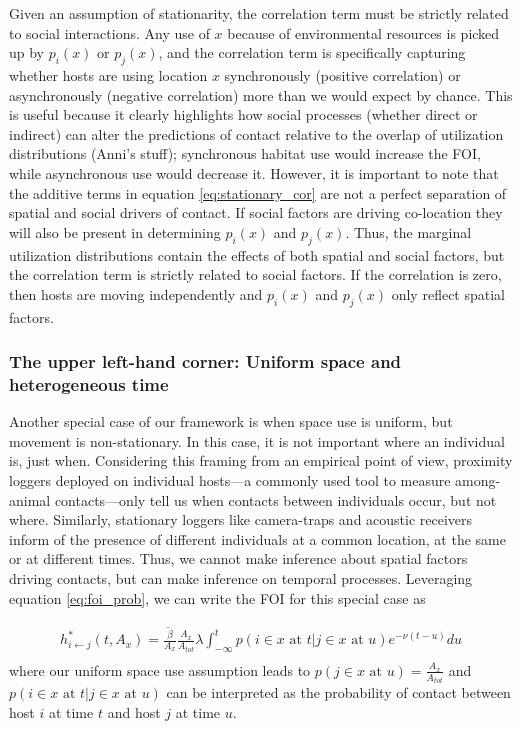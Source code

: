 \documentclass[letterpaper]{article}
\begin{document}
Given an assumption of stationarity, the correlation term must be strictly related to social interactions.  Any use of $x$ because of environmental resources is picked up by $p_i(x)$ or $p_j(x)$, and the correlation term is specifically capturing whether hosts are using location $x$ synchronously (positive correlation) or asynchronously (negative correlation) more than we would expect by chance.  This is useful because it clearly highlights how social processes (whether direct or indirect) can alter the predictions of contact relative to the overlap of utilization distributions (Anni's stuff); synchronous habitat use would increase the FOI, while asynchronous use would decrease it. However, it is important to note that the additive terms in equation \ref{eq:stationary_cor} are not a perfect separation of spatial and social drivers of contact. If social factors are driving co-location they will also be present in determining $p_i(x)$ and $p_j(x)$. Thus, the marginal utilization distributions contain the effects of both spatial and social factors, but the correlation term is strictly related to social factors.  If the correlation is zero, then hosts are moving independently and $p_i(x)$ and $p_j(x)$ only reflect spatial factors.

\subsubsection*{The upper left-hand corner: Uniform space and heterogeneous time}

Another special case of our framework is when space use is uniform, but movement is non-stationary.  In this case, it is not important where an individual is, just when. Considering this framing from an empirical point of view, proximity loggers deployed on individual hosts---a commonly used tool to measure among-animal contacts---only tell us when contacts between individuals occur, but not where.  Similarly, stationary loggers like camera-traps and acoustic receivers inform of the presence of different individuals at a common location, at the same or at different times. %
Thus, we cannot make inference about spatial factors driving contacts, but can make inference on temporal processes. Leveraging equation \ref{eq:foi_prob}, we can write the FOI for this special case as 

\begin{equation}
    \begin{aligned}
    h^*_{i \leftarrow j}(t, A_x) = \frac{\tilde{\beta}}{A_x}\frac{A_x}{A_{tot}} \lambda \int_{-\infty}^{t} p(i \in x \text{ at } t | j \in x \text{ at } u) e^{-\nu(t - u)} du \\
    \end{aligned}
    \label{eq:foi_uniform_space}
\end{equation}
where our uniform space use assumption leads to $p(j \in x \text{ at } u) = \frac{A_x}{A_{tot}}$ and $p(i \in x \text{ at } t | j \in x \text{ at } u)$ can be interpreted as the probability of contact between host $i$ at time $t$ and host $j$ at time $u$.  
\end{document}
